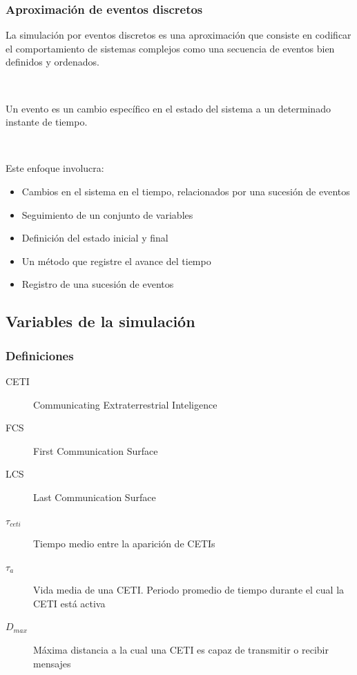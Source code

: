 \documentclass[handout]{beamer}
\theoremstyle{plain}
\theoremstyle{definition}
\theoremstyle{remark}
\begin{document}
         
\begin{frame}\frametitle{Aproximación de eventos discretos}

   La \alert{simulación por eventos discretos} es una aproximación que
   consiste en codificar el comportamiento de sistemas complejos 
   como una secuencia de eventos bien definidos y ordenados.

   \

   Un \alert{evento} es un cambio específico en el estado del sistema a un
   determinado instante de tiempo.

   \

   Este enfoque involucra:

   \begin{itemize}
      \item Cambios en el sistema en el tiempo, relacionados
         por una sucesión de eventos
      \item Seguimiento de un conjunto de variables
      \item Definición del estado inicial y final
      \item Un método que registre el avance del tiempo
      \item Registro de una sucesión de eventos
   \end{itemize}                        
  
\end{frame}
              


\subsection{Variables de la simulación}
 
\begin{frame}\frametitle{Definiciones}

   \begin{description}
      \item[CETI]  Communicating Extraterrestrial Inteligence
      \item[FCS] First Communication Surface 
      \item[LCS] Last Communication Surface 
      \item[$\tau_{ceti}$] Tiempo medio entre la aparición de CETIs
      \item[$\tau_{a}$] Vida media de una CETI.  Periodo promedio de tiempo
         durante el cual la CETI está activa
      \item[$D_{max}$] Máxima distancia a la cual una CETI es capaz de
         transmitir o recibir mensajes
   \end{description}

\end{frame}
 
\end{document}
